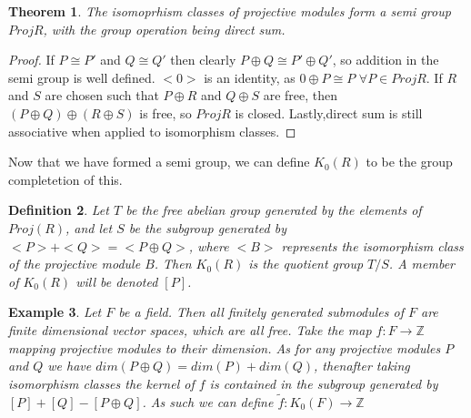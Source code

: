 \documentclass[a4paper,10pt]{article}
\newtheorem{thm}{Theorem}[subsection]
\newtheorem{defn}[thm]{Definition}
\newtheorem{ex}[thm]{Example}
\begin{document}
\begin{thm}
	The isomoprhism classes of projective modules form a semi group $ProjR$, with the group operation being direct sum.
\end{thm}
\begin{proof}
	If $P\cong P'$ and $Q\cong Q'$ then clearly $P\oplus Q\cong P'\oplus Q'$, so addition in the semi group is well defined.
	$<0>$ is an identity, as $0\oplus P\cong P$ $\forall P\in ProjR$.
	\newline If $R$ and $S$ are chosen such that $P\oplus R$ and $Q\oplus S$ are free, then $(P\oplus Q)\oplus (R\oplus S)$ is free, so $ProjR$ is closed.
	\newline Lastly,direct sum is still associative when applied to isomorphism classes.
\end{proof}

Now that we have formed a semi group, we can define $K_0(R)$ to be the group completetion of this.

\begin{defn}
	Let $T$ be the free abelian group generated by the elements of $Proj(R)$, and let $S$ be the subgroup generated by $<P>+<Q>=<P\oplus Q>$, where $<B>$ represents the isomorphism class of the projective module $B$. Then $K_{0}(R)$ is the quotient group $T/S$. A member of $K_{0}(R)$ will be denoted $[P]$.
\end{defn}

\begin{ex}
	Let $F$ be a field. Then all finitely generated submodules of $F$ are finite dimensional vector spaces, which are all free. Take the map $f:F\rightarrow \mathbb{Z}$ mapping projective modules to their dimension. As for any projective modules $P$ and $Q$ we have $dim(P\oplus Q)=dim(P)+dim(Q)$, thenafter taking isomorphism classes the kernel of $f$ is contained in the subgroup generated by $[P]+[Q]-[P\oplus Q]$. As such we can define $\tilde{f}:K_{0}(F)\rightarrow \mathbb{Z}$
\end{ex}
\end{document}
